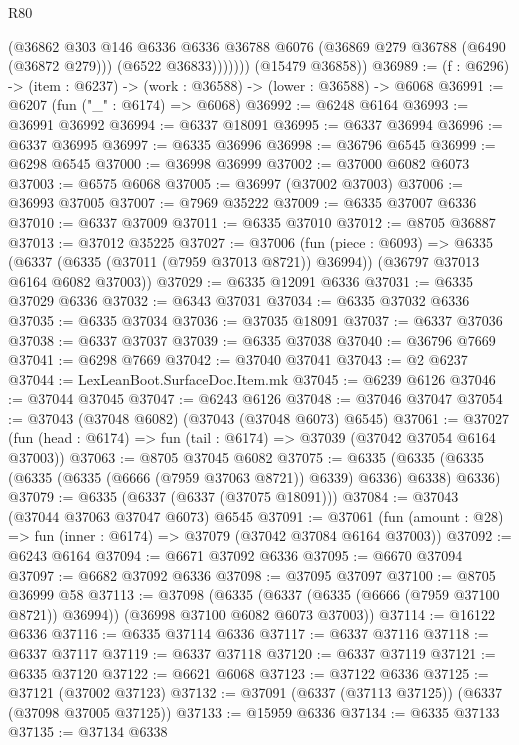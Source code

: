 \begin{lexlean}{R80}
\begin{coremodule}
                (@36862
                  @303
                  @146
                  @6336
                  @6336
                  @36788
                  @6076
                  (@36869 @279 @36788 (@6490 (@36872 @279)))
                  (@6522 @36833)))))))
      (@15479 @36858))
@36989 := (f : @6296) -> (item : @6237) -> (work : @36588) -> (lower : @36588) -> @6068
@36991 := @6207 (fun ("_" : @6174) => @6068)
@36992 := @6248 @6164
@36993 := @36991 @36992
@36994 := @6337 @18091
@36995 := @6337 @36994
@36996 := @6337 @36995
@36997 := @6335 @36996
@36998 := @36796 @6545
@36999 := @6298 @6545
@37000 := @36998 @36999
@37002 := @37000 @6082 @6073
@37003 := @6575 @6068
@37005 := @36997 (@37002 @37003)
@37006 := @36993 @37005
@37007 := @7969 @35222
@37009 := @6335 @37007 @6336
@37010 := @6337 @37009
@37011 := @6335 @37010
@37012 := @8705 @36887
@37013 := @37012 @35225
@37027 := @37006
    (fun (piece : @6093) =>
    @6335 (@6337 (@6335 (@37011 (@7959 @37013 @8721)) @36994)) (@36797 @37013 @6164 @6082 @37003))
@37029 := @6335 @12091 @6336
@37031 := @6335 @37029 @6336
@37032 := @6343 @37031
@37034 := @6335 @37032 @6336
@37035 := @6335 @37034
@37036 := @37035 @18091
@37037 := @6337 @37036
@37038 := @6337 @37037
@37039 := @6335 @37038
@37040 := @36796 @7669
@37041 := @6298 @7669
@37042 := @37040 @37041
@37043 := @2 @6237
@37044 := LexLeanBoot.SurfaceDoc.Item.mk
@37045 := @6239 @6126
@37046 := @37044 @37045
@37047 := @6243 @6126
@37048 := @37046 @37047
@37054 := @37043 (@37048 @6082) (@37043 (@37048 @6073) @6545)
@37061 := @37027 (fun (head : @6174) => fun (tail : @6174) => @37039 (@37042 @37054 @6164 @37003))
@37063 := @8705 @37045 @6082
@37075 := @6335 (@6335 (@6335 (@6335 (@6335 (@6666 (@7959 @37063 @8721)) @6339) @6336) @6338) @6336)
@37079 := @6335 (@6337 (@6337 (@37075 @18091)))
@37084 := @37043 (@37044 @37063 @37047 @6073) @6545
@37091 := @37061 (fun (amount : @28) => fun (inner : @6174) => @37079 (@37042 @37084 @6164 @37003))
@37092 := @6243 @6164
@37094 := @6671 @37092 @6336
@37095 := @6670 @37094
@37097 := @6682 @37092 @6336
@37098 := @37095 @37097
@37100 := @8705 @36999 @58
@37113 := @37098
    (@6335 (@6337 (@6335 (@6666 (@7959 @37100 @8721)) @36994)) (@36998 @37100 @6082 @6073 @37003))
@37114 := @16122 @6336
@37116 := @6335 @37114 @6336
@37117 := @6337 @37116
@37118 := @6337 @37117
@37119 := @6337 @37118
@37120 := @6337 @37119
@37121 := @6335 @37120
@37122 := @6621 @6068
@37123 := @37122 @6336
@37125 := @37121 (@37002 @37123)
@37132 := @37091 (@6337 (@37113 @37125)) (@6337 (@37098 @37005 @37125))
@37133 := @15959 @6336
@37134 := @6335 @37133
@37135 := @37134 @6338

\end{coremodule}
\end{lexlean}
